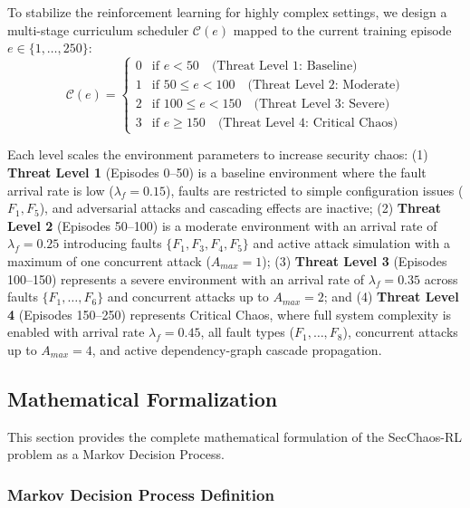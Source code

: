 \documentclass[pdflatex,sn-mathphys-num]{sn-jnl}%
\theoremstyle{thmstyleone}%
\theoremstyle{thmstyletwo}%
\theoremstyle{thmstylethree}%
\begin{document}
	To stabilize the reinforcement learning for highly complex settings, we design a multi-stage curriculum scheduler $\mathcal{C}(e)$ mapped to the current training episode $e \in \{1, \ldots, 250\}$: 
	\begin{equation}
		\mathcal{C}(e) = \begin{cases}
			0 & \text{if } e < 50 \quad \text{(Threat Level 1: Baseline)} \\
			1 & \text{if } 50 \leq e < 100 \quad \text{(Threat Level 2: Moderate)} \\
			2 & \text{if } 100 \leq e < 150 \quad \text{(Threat Level 3: Severe)} \\
			3 & \text{if } e \geq 150 \quad \text{(Threat Level 4: Critical Chaos)}
		\end{cases}
	\end{equation}
	
	Each level scales the environment parameters to increase security chaos: (1) \textbf{Threat Level 1} (Episodes 0--50) is a baseline environment where the fault arrival rate is low ($\lambda_f = 0.15$), faults are restricted to simple configuration issues ($F_1, F_5$), and adversarial attacks and cascading effects are inactive; (2) \textbf{Threat Level 2} (Episodes 50--100) is a moderate environment with an arrival rate of $\lambda_f = 0.25$ introducing faults $\{F_1, F_3, F_4, F_5\}$ and active attack simulation with a maximum of one concurrent attack ($A_{max} = 1$); (3) \textbf{Threat Level 3} (Episodes 100--150) represents a severe environment with an arrival rate of $\lambda_f = 0.35$ across faults $\{F_1, \dots, F_6\}$ and concurrent attacks up to $A_{max} = 2$; and (4) \textbf{Threat Level 4} (Episodes 150--250) represents Critical Chaos, where full system complexity is enabled with arrival rate $\lambda_f = 0.45$, all fault types ($F_1, \dots, F_8$), concurrent attacks up to $A_{max} = 4$, and active dependency-graph cascade propagation.
	
	\subsection{Mathematical Formalization}
	
	This section provides the complete mathematical formulation of the SecChaos-RL problem as a Markov Decision Process.
	
	\subsubsection{Markov Decision Process Definition}
	
\end{document}
